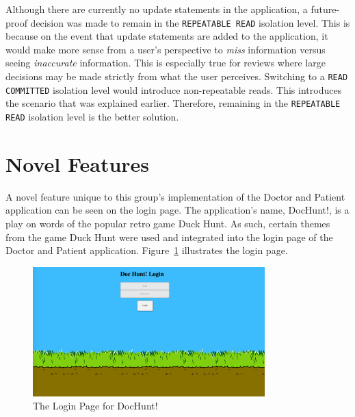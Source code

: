 \documentclass{article}
\begin{document}
Although there are currently no update statements in the application, a future-proof decision was made to remain in the \texttt{REPEATABLE READ} isolation level. This is because on the event that update statements are added to the application, it would make more sense from a user's perspective to \textit{miss} information versus seeing \textit{inaccurate} information. This is especially true for reviews where large decisions may be made strictly from what the user perceives. Switching to a \texttt{READ COMMITTED} isolation level would introduce non-repeatable reads. This introduces the scenario that was explained earlier. Therefore, remaining in the \texttt{REPEATABLE READ} isolation level is the better solution.

\section{Novel Features}
A novel feature unique to this group's implementation of the Doctor and Patient application can be seen on the login page. The application's name, DocHunt!, is a play on words of the popular retro game Duck Hunt. As such, certain themes from the game Duck Hunt were used and integrated into the login page of the Doctor and Patient application. Figure~\ref{fig:docHuntLogin} illustrates the login page.
\begin{figure}[H]
	\centering
	\includegraphics[width=0.8\textwidth]{"res/image/DocHunt Login Page"}
	\caption{The Login Page for DocHunt!}
	\label{fig:docHuntLogin}
\end{figure}
\end{document}
